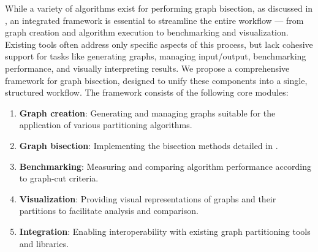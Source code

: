 \documentclass[../paper.tex]{subfiles}
\begin{document}
    While a variety of algorithms exist for performing graph bisection, as discussed in ,
    an integrated framework is essential to streamline the entire workflow
    --- from graph creation and algorithm execution to benchmarking and visualization.
    Existing tools often address only specific aspects of this process, but lack
    cohesive support for tasks like generating graphs, managing input/output, benchmarking performance, and visually interpreting results.
    We propose a comprehensive framework for graph bisection, designed to unify these components into a single, structured workflow.
    The framework consists of the following core modules:
    \begin{enumerate}
        \item \textbf{Graph creation}: Generating and managing graphs suitable for the application of various partitioning algorithms.
        \item \textbf{Graph bisection}: Implementing the bisection methods detailed in .
        \item \textbf{Benchmarking}: Measuring and comparing algorithm performance according to graph-cut criteria.
        \item \textbf{Visualization}: Providing visual representations of graphs and their partitions to facilitate analysis and comparison.
        \item \textbf{Integration}: Enabling interoperability with existing graph partitioning tools and libraries.
    \end{enumerate}
    
\end{document}
